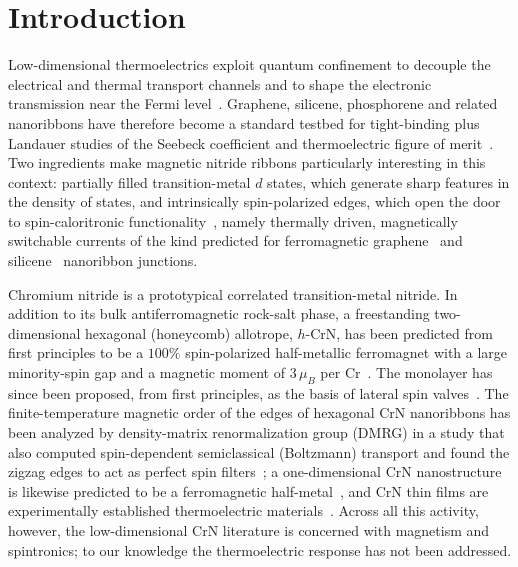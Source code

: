 \documentclass[preprint,12pt]{elsarticle}
\begin{document}
\section{Introduction}
\label{sec:intro}

Low-dimensional thermoelectrics exploit quantum confinement to decouple the electrical and
thermal transport channels and to shape the electronic transmission near the Fermi
level~\cite{Hicks1993,Mahan1996}. Graphene, silicene, phosphorene and related nanoribbons have
therefore become a standard testbed for tight-binding plus Landauer studies of the Seebeck
coefficient and thermoelectric figure of merit~\cite{OuyangGuo2009,Sevincli2010}. Two ingredients
make magnetic nitride ribbons particularly interesting in this context: partially filled
transition-metal $d$ states, which generate sharp features in the density of states, and
intrinsically spin-polarized edges, which open the door to spin-caloritronic
functionality~\cite{Bauer2012}, namely thermally driven, magnetically switchable currents of the
kind predicted for ferromagnetic graphene~\cite{Zeng2011,Song2020} and
silicene~\cite{Ghanbari2018} nanoribbon junctions.

Chromium nitride is a prototypical correlated transition-metal nitride. In addition to its bulk
antiferromagnetic rock-salt phase, a freestanding two-dimensional hexagonal (honeycomb)
allotrope, $h$-CrN, has been predicted from first principles to be a $100\%$ spin-polarized
half-metallic ferromagnet with a large minority-spin gap and a magnetic moment of $3\,\mu_B$ per
Cr~\cite{Kuklin2017}. The monolayer has since been proposed, from first principles, as the basis
of lateral spin valves~\cite{Modarresi2019}. The finite-temperature magnetic order of the edges
of hexagonal CrN nanoribbons has been analyzed by density-matrix renormalization group (DMRG) in
a study that also computed spin-dependent semiclassical (Boltzmann) transport and
found the zigzag edges to act as perfect spin filters~\cite{CrNdmrg2023}; a one-dimensional
CrN nanostructure is likewise predicted to be a ferromagnetic half-metal~\cite{Xiang2023}, and
CrN thin films are experimentally established thermoelectric
materials~\cite{Quintela2009,Eklund2016,Sabeer2021}. Across all this activity, however, the
low-dimensional CrN literature is concerned with magnetism and spintronics; to our knowledge
the thermoelectric response has not been addressed.
\end{document}
